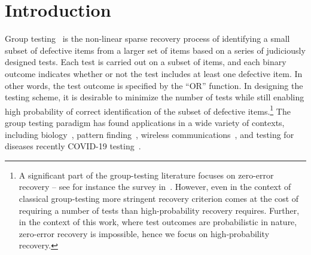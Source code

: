 \documentclass[onecolumn,letterpaper]{IEEEtran}
\begin{document}
\begin{abstract}
Some of our techniques may be of independent interest -- in particular our achievability requires a delicate saddle-point approximation, our impossibility proof relies on a novel bound relating the mutual information of pair of random variables with the mean and variance of a specific function, and as a by-product of our proof showing that our sample-complexity upper and lower bounds are close we derive novel structural results about monotone functions.
\end{abstract}




\section{Introduction}
\label{sec:introduction}
Group testing~\cite{dorfman1943detection} is the non-linear sparse recovery process of identifying a small subset of defective items from a larger set of items based on a series of judiciously designed tests. Each test is carried out on a subset of items, and each binary outcome indicates whether or not the test includes at least one defective item. In other words, the test outcome is specified by the ``OR'' function. In designing the testing scheme, it is desirable to minimize the number of tests while still enabling high probability of correct identification of the subset of defective items.\footnote{A significant part of the group-testing literature focuses on zero-error recovery -- see for instance the survey in~\cite{du2000combinatorial}. However, even in the context of classical group-testing more stringent recovery criterion comes at the cost of requiring a number of tests than high-probability recovery requires. Further, in the context of this work, where test outcomes are probabilistic in nature, zero-error recovery is impossible, hence we focus on high-probability recovery.} 
The group testing paradigm has found applications in a wide variety of contexts, including biology~\cite{ngo2000survey}, pattern finding~\cite{macula2004}, wireless communications~\cite{berger1984,wolf1985}, and testing for diseases recently COVID-19 testing~\cite{gollier2020group}.
\end{document}
